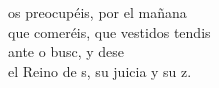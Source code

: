 \begin{cancion}[No os preocupéis][]%
	 os preocupéis, por el mañana\\
	que comeréis, que vestidos tendis \\
	ante o busc, y dese\\
	el Reino de s, su juicia y su z.\\
\end{cancion}%
